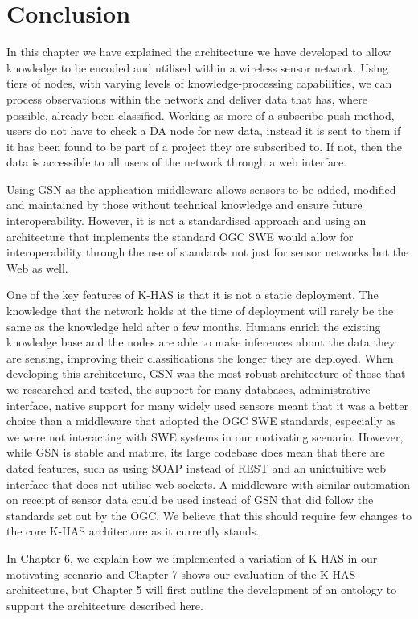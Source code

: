 	\section{Conclusion}\label{arch:conc}
		In this chapter we have explained the architecture we have developed to allow knowledge to be encoded and utilised within a wireless sensor network. Using tiers of nodes, with varying levels of knowledge-processing capabilities, we can process observations within the network and deliver data that has, where possible, already been classified. Working as more of a subscribe-push method, users do not have to check a DA node for new data, instead it is sent to them if it has been found to be part of a project they are subscribed to. If not, then the data is accessible to all users of the network through a web interface.

		Using GSN as the application middleware allows sensors to be added, modified and maintained by those without technical knowledge and ensure future interoperability. However, it is not a standardised approach and using an architecture that implements the standard OGC SWE\cite{botts} would allow for interoperability through the use of standards not just for sensor networks but the Web as well. 
		
		One of the key features of K-HAS is that it is not a static deployment. The knowledge that the network holds at the time of deployment will rarely be the same as the knowledge held after a few months. Humans enrich the existing knowledge base and the nodes are able to make inferences about the data they are sensing, improving their classifications the longer they are deployed. When developing this architecture, GSN was the most robust architecture of those that we researched and tested, the support for many databases, administrative interface, native support for many widely used sensors meant that it was a better choice than a middleware that adopted the OGC SWE standards, especially as we were not interacting with SWE systems in our motivating scenario. However, while GSN is stable and mature, its large codebase does mean that there are dated features, such as using SOAP instead of REST and an unintuitive web interface that does not utilise web sockets. A middleware with similar automation on receipt of sensor data could be used instead of GSN that did follow the standards set out by the OGC. We believe that this should require few changes to the core K-HAS architecture as it currently stands.
		
		In Chapter 6, we explain how we implemented a variation of K-HAS in our motivating scenario and Chapter 7 shows our evaluation of the K-HAS architecture, but Chapter 5 will first outline the development of an ontology to support the architecture described here.
		
			
			
			
			
			
			
			
			
